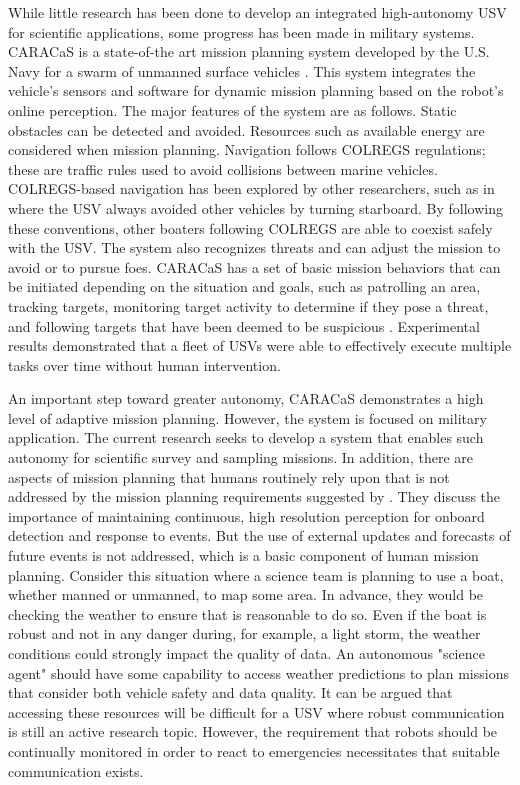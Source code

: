 \documentclass{tamuccthesis}
\begin{document}
While little research has been done to develop an integrated high-autonomy USV for scientific applications, some progress has been made in military systems. CARACaS is a state-of-the art mission planning system developed by the U.S. Navy for a swarm of unmanned surface vehicles \cite{heo2017case}. This system integrates the vehicle's sensors and software for dynamic mission planning based on the robot's online perception. The major features of the system are as follows. Static obstacles can be detected and avoided. Resources such as available energy are considered when mission planning. Navigation follows COLREGS regulations; these are traffic rules used to avoid collisions between marine vehicles. COLREGS-based navigation has been explored by other researchers, such as in \cite{naeem2012colregs} where the USV always avoided other vehicles by turning starboard. By following these conventions, other boaters following COLREGS are able to coexist safely with the USV. The system also recognizes threats and can adjust the mission to avoid or to pursue foes. CARACaS has a set of basic mission behaviors that can be initiated depending on the situation and goals, such as patrolling an area, tracking targets, monitoring target activity to determine if they pose a threat, and following targets that have been deemed to be suspicious \cite{wolf2017caracas}. Experimental results demonstrated that a fleet of USVs were able to effectively execute multiple tasks over time without human intervention. 

An important step toward greater autonomy, CARACaS demonstrates a high level of adaptive mission planning. However, the system is focused on military application. The current research seeks to develop a system that enables such autonomy for scientific survey and sampling missions. In addition, there are aspects of mission planning that humans routinely rely upon that is not addressed by the mission planning requirements suggested by \cite{heo2017case}. They discuss the importance of maintaining continuous, high resolution perception for onboard detection and response to events. But the use of external updates and forecasts of future events is not addressed, which is a basic component of human mission planning. Consider this situation where a science team is planning to use a boat, whether manned or unmanned, to map some area. In advance, they would be checking the weather to ensure that is reasonable to do so. Even if the boat is robust and not in any danger during, for example, a light storm, the weather conditions could strongly impact the quality of data. An autonomous "science agent" should have some capability to access weather predictions to plan missions that consider both vehicle safety and data quality. It can be argued that accessing these resources will be difficult for a USV where robust communication is still an active research topic. However, the requirement that robots should be continually monitored in order to react to emergencies necessitates that suitable communication exists. 
\end{document}
